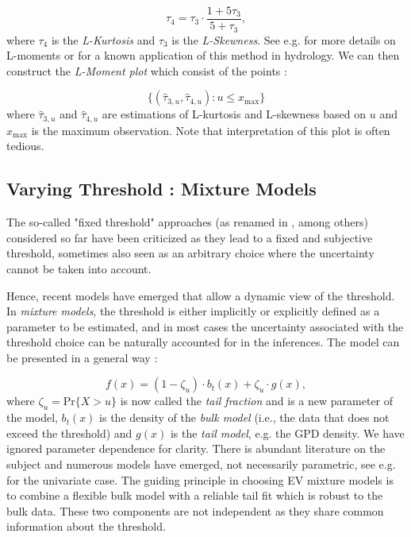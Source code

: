 \begin{equation}
\tau_4=\tau_3\cdot \frac{1+5\tau_3}{5+\tau_3},
\end{equation}
where $\tau_4$ is the \emph{L-Kurtosis} and $\tau_3$ is the \emph{L-Skewness}. See e.g. \citet{hosking_regional_1997} for more details on L-moments or \citet{peel_utility_2001} for a known application of this method in hydrology.
We can then construct the \emph{L-Moment plot} which consist of the points :

\begin{equation}
\Big\{(\hat{\tau}_{3,u},\hat{\tau}_{4,u}) : u\leq x_{\text{max}}\Big\}
\end{equation}
where $\hat{\tau}_{3,u}$ and $\hat{\tau}_{4,u}$ are estimations of L-kurtosis and L-skewness based on $u$ and $x_{\text{max}}$ is the maximum observation. Note that interpretation of this plot is often tedious.






\subsection{Varying Threshold : Mixture Models}

The so-called "fixed threshold" approaches (as renamed in 
\citet{scarrott_review_2012}, among others) considered so far have been criticized as they lead to a fixed and subjective threshold, sometimes also seen as an arbitrary choice where the uncertainty cannot be taken into account. 



Hence, recent models have emerged that allow a dynamic view of the threshold. In \textit{mixture models}, the threshold is either implicitly or explicitly defined as a parameter to be estimated, and in most cases the uncertainty associated with the threshold choice can be naturally accounted for in the inferences. The model can be presented in a general way : 

\begin{equation}
f(x)=(1-\zeta_u)\cdot b_t(x)+\zeta_u\cdot g(x),
\end{equation}
where $\zeta_u=\text{Pr}\big\{X>u\big\}$ is now called the \emph{tail fraction} and is a new parameter of the model, $b_t(x)$ is the density of the \textit{bulk model} (i.e., the data that does not exceed the threshold) and $g(x)$ is the \emph{tail model}, e.g. the GPD density. We have ignored parameter dependence for clarity. There is abundant literature on the subject and numerous models have emerged, not necessarily parametric, see e.g. \citet[chap.3]{dey_extreme_2016} for the univariate case.
The guiding principle in choosing EV mixture models is to combine a flexible bulk model with a reliable tail fit which is robust to the bulk data. These two components are not independent as they share common information about the threshold.


